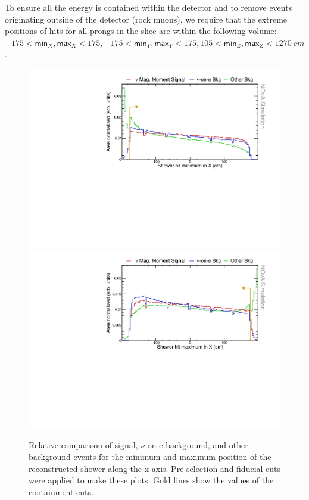 To ensure all the energy is contained within the detector and to remove events originating outside of the detector (rock muons), we require that the extreme positions of hits for all prongs in the slice are within the following volume: $-175<\textsf{min}_X, \textsf{max}_X<175, -175<\textsf{min}_Y, \textsf{max}_Y<175, 105<\textsf{min}_Z, \textsf{max}_Z<1270\ \unit{cm}$. 

\begin{figure}[hbtp]
\centering
\includegraphics[width=.9\textwidth]{Plots/NuMMEventSelection/N1Cut_minX.pdf}
\includegraphics[width=.9\textwidth]{Plots/NuMMEventSelection/N1Cut_maxX.pdf}
\caption{Relative comparison of signal, $\nu$-on-e background, and other background events for the minimum and maximum position of the reconstructed shower along the x axis. Pre-selection and fiducial cuts were applied to make these plots. Gold lines show the values of the containment cuts.}
\label{fig:ContainmentCutsX}
\end{figure}

